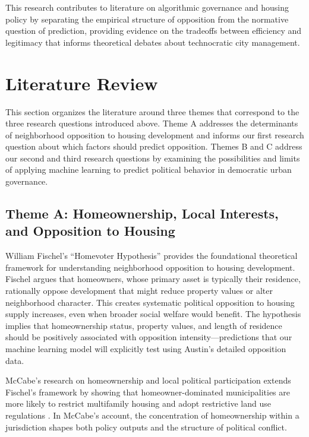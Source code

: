 \documentclass[12pt]{article}
\begin{document}
This research contributes to literature on algorithmic governance and housing policy by separating the empirical structure of opposition from the normative question of prediction, providing evidence on the tradeoffs between efficiency and legitimacy that informs theoretical debates about technocratic city management.


\section{Literature Review}

This section organizes the literature around three themes that correspond to the three research questions introduced above. Theme A addresses the determinants of neighborhood opposition to housing development and informs our first research question about which factors should predict opposition. Themes B and C address our second and third research questions by examining the possibilities and limits of applying machine learning to predict political behavior in democratic urban governance.

\subsection{Theme A: Homeownership, Local Interests, and Opposition to Housing}

William Fischel's ``Homevoter Hypothesis'' \autocite{fischel2001} provides the foundational theoretical framework for understanding neighborhood opposition to housing development. Fischel argues that homeowners, whose primary asset is typically their residence, rationally oppose development that might reduce property values or alter neighborhood character. This creates systematic political opposition to housing supply increases, even when broader social welfare would benefit. The hypothesis implies that homeownership status, property values, and length of residence should be positively associated with opposition intensity---predictions that our machine learning model will explicitly test using Austin's detailed opposition data.

McCabe's research on homeownership and local political participation extends Fischel's framework by showing that homeowner-dominated municipalities are more likely to restrict multifamily housing and adopt restrictive land use regulations \autocite{mccabe2016}. In McCabe's account, the concentration of homeownership within a jurisdiction shapes both policy outputs and the structure of political conflict.
\end{document}
